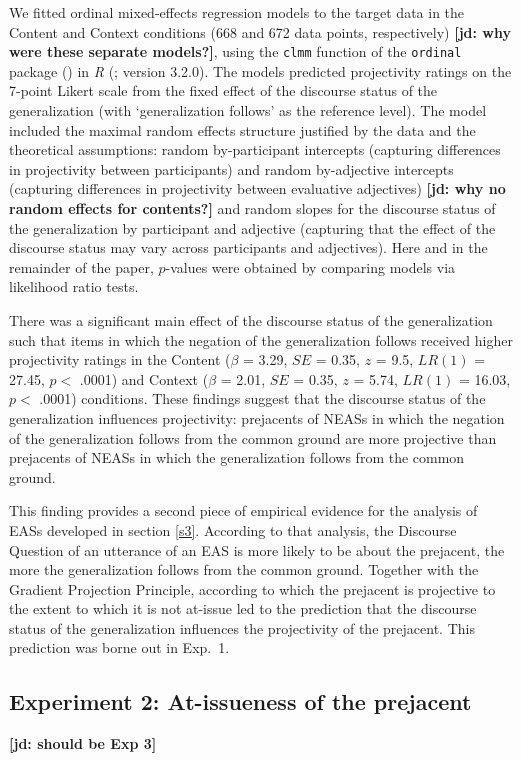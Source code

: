 \documentclass[11pt,fleqn]{article}
\newcommand{\6}{\mbox{$[\hspace*{-.6mm}[$}}
\newcommand{\9}{\mbox{$]\hspace*{-.6mm}]$}}
\newcommand{\jd}[1]{\textbf{\color{green}[jd: #1]}}
\begin{document}
We fitted ordinal mixed-effects regression models to the target data in the Content and Context conditions (668 and 672 data points, respectively) \jd{why were these separate models?}, using the {\tt clmm} function of the {\tt ordinal} package (\citealt{Christensen2013}) in {\em R} (\citealt{r}; version 3.2.0). The models predicted projectivity ratings on the 7-point Likert scale from the fixed effect of the discourse status of the generalization (with `generalization follows' as the reference level). The model included the maximal random effects structure justified by the data and the theoretical assumptions: random by-participant intercepts (capturing differences in projectivity between participants) and random by-adjective intercepts (capturing differences in projectivity between evaluative adjectives) \jd{why no random effects for contents?} and random slopes for the discourse status of the generalization by participant and adjective (capturing that the effect of the discourse status may vary across participants and adjectives). Here and in the remainder of the paper, $p$-values were obtained by comparing models via likelihood ratio tests.

There was a significant main effect of the discourse status of the generalization such that items in which the negation of the generalization follows received higher projectivity ratings in the Content ($\beta$ = 3.29, $SE$ = 0.35, $z$ = 9.5, $LR(1)$ = 27.45, $p <$ .0001) and Context ($\beta$ = 2.01, $SE$ = 0.35, $z$ = 5.74, $LR(1)$ = 16.03, $p <$ .0001) conditions. These findings suggest that the discourse status of the generalization influences projectivity: prejacents of NEASs in which the negation of the generalization follows from the common ground are more projective than prejacents of NEASs in which the generalization follows from the common ground.

This finding provides a second piece of empirical evidence for the analysis of EASs developed in section \ref{s3}. According to that analysis, the Discourse Question of an utterance of an EAS is more likely to be about the prejacent, the more the generalization follows from the common ground.  Together with the Gradient Projection Principle, according to which the prejacent is projective to the extent to which it is not at-issue led to the prediction that the discourse status of the generalization influences the projectivity of the prejacent. This prediction was borne out in Exp.~1.

\subsection{Experiment 2: At-issueness of the prejacent}\label{s43}
\jd{should be Exp 3}
\end{document}
